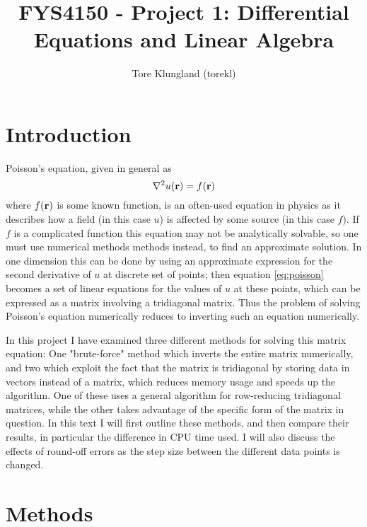 \documentclass[a4paper,english]{article}
\title{FYS4150 - Project 1: Differential Equations and Linear Algebra}
\author{Tore Klungland (torekl)}
\renewcommand\vec{\mathbf}
\let\originalleft\left
\let\originalright\right
\renewcommand{\left}{\mathopen{}\mathclose\bgroup\originalleft}
\renewcommand{\right}{\aftergroup\egroup\originalright}
\begin{document}
\maketitle
\section{Introduction}
Poisson's equation, given in general as
\begin{equation}
  \nabla^2 u\left(\vec{r}\right) = f\left(\vec{r}\right)
  \label{eq:poisson}
\end{equation}
where $f\left(\vec{r}\right)$ is some known function, is an often-used equation in physics as it describes how a field (in this case $u$) is affected by some source (in this case $f$). If $f$ is a complicated function this equation may not be analytically solvable, so one must use numerical methods methods instead, to find an approximate solution. In one dimension this can be done by using an approximate expression for the second derivative of $u$ at discrete set of points; then equation \ref{eq:poisson} becomes a set of linear equations for the values of $u$ at these points, which can be expressed as a matrix involving a tridiagonal matrix. Thus the problem of solving Poisson's equation numerically reduces to inverting such an equation numerically. \par
In this project I have examined three different methods for solving this matrix equation: One "brute-force" method which inverts the entire matrix numerically, and two which exploit the fact that the matrix is tridiagonal by storing data in vectors instead of a matrix, which reduces memory usage and speeds up the algorithm. One of these uses a general algorithm for row-reducing tridiagonal matrices, while the other takes advantage of the specific form of the matrix in question. In this text I will first outline these methods, and then compare their results, in particular the difference in CPU time used. I will also discuss the effects of round-off errors as the step size between the different data points is changed.
\section{Methods}
\end{document}
